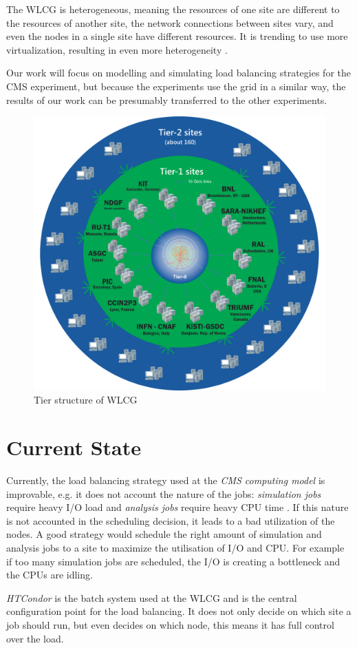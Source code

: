 The WLCG is heterogeneous, meaning the resources of one site are different to the resources of another site, the network connections between sites vary, and even the nodes in a single site have different resources. It is trending to use more virtualization, resulting in even more heterogeneity \cite{wlcg_update}.

Our work will focus on modelling and simulating load balancing strategies for the CMS experiment, but because the experiments use the grid in a similar way, the results of our work can be presumably transferred to the other experiments.

	\begin{figure}
		\centering
		\includegraphics[width=0.65\linewidth]{images/WLCG}
		\caption[]{Tier structure of WLCG \cite{wlcg_tiers}}
		\label{fig:wlcg}
	\end{figure}
	

\section{Current State}
Currently, the load balancing strategy used at the \textit{CMS computing model} is improvable, e.g. it does not account the nature of the jobs: \textit{simulation jobs} require heavy I/O load and \textit{analysis jobs} require heavy CPU time \cite{1742-6596-331-7-072038}. If this nature is not accounted in the scheduling decision, it leads to a bad utilization of the nodes. A good strategy would schedule the right amount of simulation and analysis jobs to a site to maximize the utilisation of I/O and CPU. For example if too many simulation jobs are scheduled, the I/O is creating a bottleneck and the CPUs are idling. 

\textit{HTCondor} is the batch system used at the WLCG and is the central configuration point for the load balancing.
It does not only decide on which site a job should run, but even decides on which node, this means it has full control over the load.

